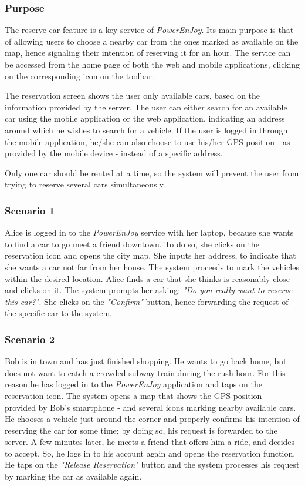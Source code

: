 \subsubsection{Purpose}
The reserve car feature is a key service of \emph{PowerEnJoy}. Its main purpose is that of allowing users to choose a nearby car from the ones marked as available on the map, hence signaling their intention of reserving it for an hour. The service can be accessed from the home page of both the web and mobile applications, clicking on the corresponding icon on the toolbar.

The reservation screen shows the user only available cars, based on the information provided by the server. The user can either search for an available car using the mobile application or the web application, indicating an address around which he wishes to search for a vehicle. If the user is logged in through the mobile application, he/she can also choose to use his/her GPS position - as provided by the mobile device - instead of a specific address.

Only one car should be rented at a time, so the system will prevent the user from trying to reserve several cars simultaneously.

\subsubsection{Scenario 1}
Alice is logged in to the \emph{PowerEnJoy} service with her laptop, because she wants to find a car to go meet a friend downtown. To do so, she clicks on the reservation icon and opens the city map. She inputs her address, to indicate that she wants a car not far from her house. The system proceeds to mark the vehicles within the desired location. Alice finds a car that she thinks is reasonably close and clicks on it. The system prompts her asking: \emph{"Do you really want to reserve this car?"}. She clicks on the \emph{"Confirm"} button, hence forwarding the request of the specific car to the system.

\subsubsection{Scenario 2}
Bob is in town and has just finished shopping. He wants to go back home, but does not want to catch a crowded subway train during the rush hour. For this reason he has logged in to the \emph{PowerEnJoy} application and taps on the reservation icon. The system opens a map that shows the GPS position - provided by Bob's smartphone - and several icons marking nearby available cars. He chooses a vehicle just around the corner and properly confirms his intention of reserving the car for some time; by doing so, his request is forwarded to the server. A few minutes later, he meets a friend that offers him a ride, and decides to accept. So, he logs in to his account again and opens the reservation function. He taps on the \emph{"Release Reservation"} button and the system processes his request by marking the car as available again.

